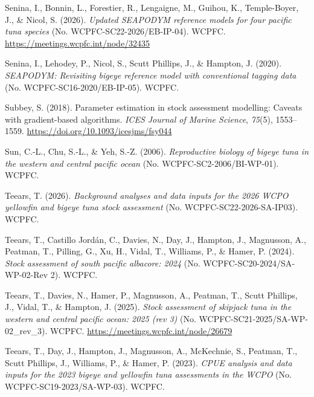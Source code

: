 \documentclass[
  english,
  a4paper,
  a4paper,
  11pt]{SCreport}
\newlength{\cslhangindent}
\newenvironment{CSLReferences}[2] %
 {\begin{list}{}{%
  \setlength{\itemindent}{0pt}
  \setlength{\leftmargin}{0pt}
  \setlength{\parsep}{0pt}
  \ifodd #1
   \setlength{\leftmargin}{\cslhangindent}
   \setlength{\itemindent}{-1\cslhangindent}
  \fi
  \setlength{\itemsep}{#2\baselineskip}}}
 {\end{list}}
\begin{document}
\begin{CSLReferences}{1}{0}
Senina, I., Bonnin, L., Forestier, R., Lengaigne, M., Guihou, K.,
Temple-Boyer, J., \& Nicol, S. (2026). \emph{Updated {SEAPODYM}
reference models for four pacific tuna species} (No.
{WCPFC}-{SC}22-2026/{EB}-{IP}-04). WCPFC.
\url{https://meetings.wcpfc.int/node/32435}

Senina, I., Lehodey, P., Nicol, S., Scutt Phillips, J., \& Hampton, J.
(2020). \emph{{SEAPODYM}: Revisiting bigeye reference model with
conventional tagging data} (No. {WCPFC}-{SC}16-2020/{EB}-{IP}-05).
WCPFC.

Subbey, S. (2018). Parameter estimation in stock assessment modelling:
Caveats with gradient-based algorithms. \emph{ICES Journal of Marine
Science}, \emph{75}(5), 1553--1559.
\url{https://doi.org/10.1093/icesjms/fsy044}

Sun, C.-L., Chu, S.-L., \& Yeh, S.-Z. (2006). \emph{Reproductive biology
of bigeye tuna in the western and central pacific ocean} (No.
{WCPFC}-{SC}2-2006/{BI}-{WP}-01). WCPFC.

Teears, T. (2026). \emph{Background analyses and data inputs for the
2026 {WCPO} yellowfin and bigeye tuna stock assessment} (No.
{WCPFC}-{SC}22-2026-{SA}-{IP}03). WCPFC.

Teears, T., Castillo Jordán, C., Davies, N., Day, J., Hampton, J.,
Magnusson, A., Peatman, T., Pilling, G., Xu, H., Vidal, T., Williams,
P., \& Hamer, P. (2024). \emph{Stock assessment of south pacific
albacore: 2024} (No. {WCPFC}-{SC}20-2024/{SA}-{WP}-02-Rev 2). WCPFC.

Teears, T., Davies, N., Hamer, P., Magnusson, A., Peatman, T., Scutt
Phillips, J., Vidal, T., \& Hampton, J. (2025). \emph{Stock assessment
of skipjack tuna in the western and central pacific ocean: 2025 (rev 3)}
(No. {WCPFC}-{SC}21-2025/{SA}-{WP}-02\_rev\_3). WCPFC.
\url{https://meetings.wcpfc.int/node/26679}

Teears, T., Day, J., Hampton, J., Magnusson, A., McKechnie, S., Peatman,
T., Scutt Phillips, J., Williams, P., \& Hamer, P. (2023). \emph{{CPUE}
analysis and data inputs for the 2023 bigeye and yellowfin tuna
assessments in the {WCPO}} (No. {WCPFC}-{SC}19-2023/{SA}-{WP}-03).
WCPFC.


\end{CSLReferences}
\end{document}
